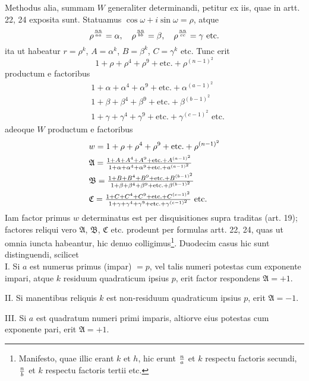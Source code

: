 \documentclass[twoside,12pt]{memoir}
\let\oldfrac\frac
\def\frac#1#2{\mathchoice{\tfrac{#1}{#2}}{\oldfrac{#1}{#2}}{\genfrac{}{}{}{2}{#1}{#2\mathstrut}}{\genfrac{}{}{}{3}{#1}{#2\mathstrut}}}
\begin{document}
Methodus alia, summam \(W\) generaliter determinandi, petitur ex iis, quae in artt. 22, 24 exposita sunt. Statuamus \(\cos \omega+i \sin \omega=\rho\), atque
\[\rho^{\frac{n n}{a a}}=\alpha, \quad \rho^{\frac{n n}{b b}}=\beta, \quad \rho^{\frac{n n}{c c}}=\gamma \text{ etc.}\]
ita ut habeatur \(r=\rho^{k}\), \(A=\alpha^{k}\), \(B=\beta^{k}\), \(C=\gamma^{k}\) etc. Tunc erit
\[1+\rho+\rho^{4}+\rho^{9}+\text{etc.}+\rho^{(n-1)^{2}}\]
productum e factoribus
\[\begin{aligned}
& 1+\alpha+\alpha^{4}+\alpha^{9}+\text{etc.}+\alpha^{(a-1)^{2}} \\
& 1+\beta+\beta^{4}+\beta^{9}+\text{etc.}+\beta^{(b-1)^{2}} \\
& 1+\gamma+\gamma^{4}+\gamma^{9}+\text{etc.}+\gamma^{(c-1)^{2}} \text{ etc.}
\end{aligned}\]\pagebreak%
adeoque \(W\) productum e factoribus
\[\begin{aligned}
& w=1+\rho+\rho^{4}+\rho^{9}+\text{etc.}+\rho^{(n-1)^{2}} \\
& \mathfrak{A}=\frac{1+A+A^{4}+A^{9}+\text{etc.}+A^{(a-1)^{2}}}{1+\alpha+\alpha^{4}+\alpha^{9}+\text{etc.}+a^{(a-1)^{2}}} \\
& \mathfrak{B}=\frac{1+B+B^{4}+B^{9}+\text{etc.}+B^{(b-1)^{2}}}{1+\beta+\beta^{4}+\beta^{9}+\text{etc.}+\beta^{(b-1)^2}} \\
& \mathfrak{C}=\frac{1+C+C^{4}+C^{9}+\text{etc.}+C^{(c-1)^{2}}}{1+\gamma+\gamma^{4}+\gamma^{9}+\text{etc.}+\gamma^{(c-1)^{2}}} \text{ etc.}
\end{aligned}\]
Iam factor primus \(w\) determinatus est per disquisitiones supra traditas (art. 19); factores reliqui vero \(\mathfrak{A}\), \(\mathfrak{B}\), \(\mathfrak{C}\) etc. prodeunt per formulas artt. 22, 24, quas ut omnia iuncta habeantur, hic denuo colligimus\footnote{Manifesto, quae illic erant \(k\) et \(h\), hic erunt \(\frac{n}{a}\) et \(k\) respectu factoris secundi, \(\frac{n}{b}\) et \(k\) respectu factoris tertii etc.}. Duodecim casus hic sunt distinguendi, scilicet\\
 
I. Si \(a\) est numerus primus (impar) \(=p\), vel talis numeri potestas cum exponente impari, atque \(k\) residuum quadraticum ipsius \(p\), erit factor respondens \(\mathfrak{A}=+1\).
 
II. Si manentibus reliquis \(k\) est non-residuum quadraticum ipsius \(p\), erit \(\mathfrak{A}=-1\).
 
III. Si \(a\) est quadratum numeri primi imparis, altiorve eius potestas cum exponente pari, erit \(\mathfrak{A}=+1\).
\end{document}
